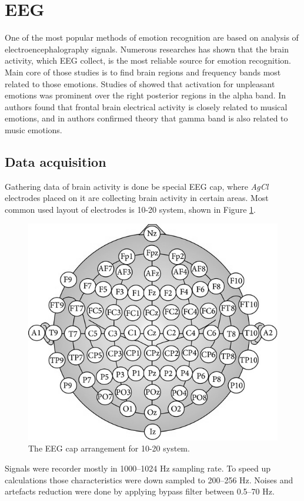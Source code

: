 \documentclass[10pt,journal,compsoc,twoside]{IEEEtran}
\newcommand{\Ref}[2]{#2 \ref{#1}}
\begin{document}
\section{EEG}
One of the most popular methods of emotion recognition are based on analysis of electroencephalography signals. Numerous researches\cite{LinMusic,GaoMehmood,NieWangShiLu} has shown that the brain activity, which EEG collect, is the most reliable source for emotion recognition. Main core of those studies is to find brain regions and frequency bands most related to those emotions. Studies of \cite{SarloBuodoPoliPalomba} showed that activation for unpleasant emotions was prominent over the right posterior regions in the alpha band. In \cite{SchmidtTrainor2001} authors found that frontal brain electrical activity is closely related to musical emotions, and in \cite{LiLu2009} authors confirmed theory that gamma band is also related to music emotions.

\subsection{Data acquisition} 
Gathering data of brain activity is done be special EEG cap, where \textit{AgCl} electrodes placed on it are collecting brain activity in certain areas. Most common used layout of electrodes is 10-20 system, shown in \Ref{fig:1020electrodes}{Figure}.

\begin{figure}[ht]
	\centering
	\includegraphics[width=0.7\linewidth]{10_20_electrodes}
	\caption{The EEG cap arrangement for 10-20 system.\cite{JirayucharoensakSuwichaPanngumIsrasenaPasin2014}}
	\label{fig:1020electrodes}
\end{figure}

Signals were recorder mostly in \numrange[range-phrase = --]{1000}{1024} Hz sampling rate. To speed up calculations those characteristics were down sampled to \numrange[range-phrase = --]{200}{256} Hz. Noises and artefacts reduction were done by applying bypass filter between  \numrange{0.5}{70} Hz.
\end{document}
